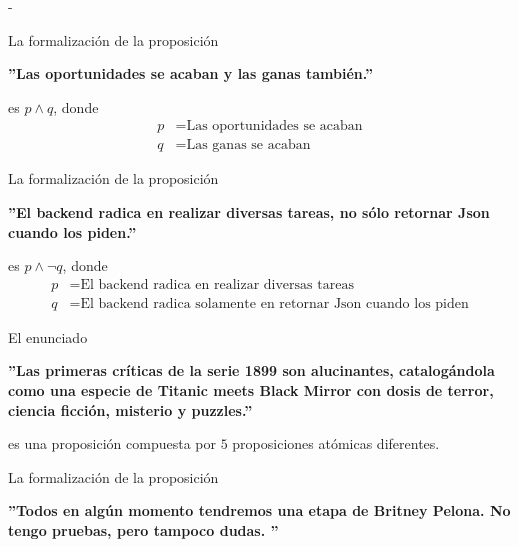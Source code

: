 \documentclass[12pt, a4paper]{exam}
\makeatletter
\renewenvironment{checkboxes}%
   {\setcounter{choice}{0}\list{\checkbox@char}%
      {%
        \settowidth{\leftmargin}{W.\hskip\labelsep\hskip 2.5em}%
        \def\choice{%
          \if@correctchoice
            \color@endgroup \endgroup
          \fi
          \stepcounter{choice}
          \item[\checked@char]
          \do@choice@pageinfo
        } %
        \def\CorrectChoice{%
          \if@correctchoice
            \color@endgroup \endgroup
          \fi
          \ifprintanswers
            \ifhmode \unskip\unskip\unvbox\voidb@x \fi
            \begingroup \color@begingroup \@correctchoicetrue
            \CorrectChoice@Emphasis
            \stepcounter{choice}
            \item[\checked@char]
          \else
            \stepcounter{choice}
            \item[\checked@char]
          \fi
          \do@choice@pageinfo
        } %
        \let\correctchoice\CorrectChoice
        \labelwidth\leftmargin\advance\labelwidth-\labelsep
        \topsep=0pt
        \partopsep=0pt
        \checkboxeshook
      }%
   }%
   {\if@correctchoice \color@endgroup \endgroup \fi \endlist}
\makeatother
\begin{document}
    \begin{questions}
        \begin{checkboxes}
            \choice La formalización de la proposición
            \begin{center}
                \textbf{''Las oportunidades se acaban y las ganas también.''}
            \end{center} 

            es $p \land q$, donde 
            \begin{align*}
                p &= \text{Las oportunidades se acaban} \\ 
                q &= \text{Las ganas se acaban}
            \end{align*} %

            \choice La formalización de la proposición
            \begin{center}
                \textbf{''El backend radica en realizar diversas tareas, no 
                sólo retornar Json cuando los piden.''}
            \end{center}
            
            es $p \land \neg q$, donde 
            \begin{align*}
                p &= \text{El backend radica en realizar diversas tareas} \\ 
                q &= \text{El backend radica solamente en retornar Json cuando 
                los piden}
            \end{align*} %

            \choice El enunciado 
            \begin{center}
                \textbf{''Las primeras críticas de la serie 1899 son alucinantes, 
                catalogándola como una especie de Titanic meets Black Mirror con 
                dosis de terror, ciencia ficción, misterio y puzzles.''}
            \end{center}

            es una proposición compuesta por $5$ proposiciones atómicas 
            diferentes.
 
            \choice La formalización de la proposición
            \begin{center}
                \textbf{''Todos en algún momento tendremos una etapa de 
                Britney Pelona. No tengo pruebas, pero tampoco dudas. ''}
            \end{center}


\end{checkboxes}
\end{questions}
\end{document}
